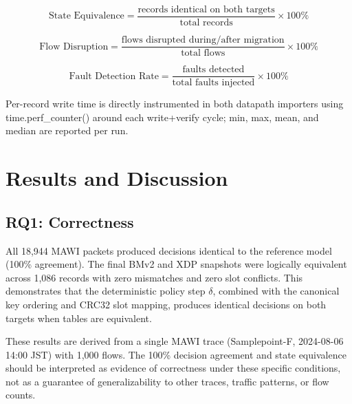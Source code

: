 \documentclass[10pt, conference, compsoc]{IEEEtran}
\begin{document}
\begin{equation}
    \text{State Equivalence} =
    \frac{\text{records identical on both targets}}{\text{total records}}
    \times 100\%
\label{eq:state_equivalence}
\end{equation}

\begin{equation}
    \text{Flow Disruption} =
    \frac{\text{flows disrupted during/after migration}}{\text{total flows}}
    \times 100\%
\label{eq:flow_disruption}
\end{equation}

\begin{equation}
    \text{Fault Detection Rate} =
    \frac{\text{faults detected}}{\text{total faults injected}} \times 100\%
\label{eq:fault_detection}
\end{equation}

Per-record write time is directly instrumented in both datapath importers using
time.perf\_counter() around each write+verify cycle; min, max, mean, and median
are reported per run.

\section{Results and Discussion}
\label{sec:results}

\subsection{RQ1: Correctness}
\label{subsec:rq1}
All 18{,}944 MAWI packets produced decisions identical to the reference model
(100\% agreement). The final BMv2 and XDP snapshots were logically equivalent
across 1{,}086 records with zero mismatches and zero slot conflicts. This
demonstrates that the deterministic policy step $\delta$, combined with the
canonical key ordering and CRC32 slot mapping, produces identical decisions on
both targets when tables are equivalent.

These results are derived from a single MAWI trace (Samplepoint-F, 2024-08-06
14:00 JST) with 1,000 flows. The 100\% decision agreement and state equivalence
should be interpreted as evidence of correctness under these specific
conditions, not as a guarantee of generalizability to other traces, traffic
patterns, or flow counts.
\end{document}
